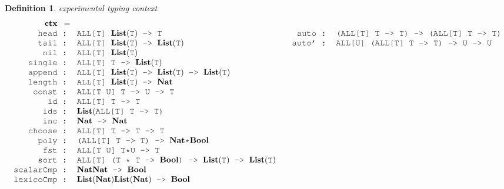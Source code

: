 \documentclass[table,dvipsnames,acmsmall]{acmart}
\theoremstyle{definition}
\newtheorem{definition}{Definition}[section]
\begin{document}
\begin{definition} 
  \label{def:experimental_typing_context}
  \emph{experimental typing context}
  \tiny
  \nopad
  \[
  \begin{array}[t]{ll}
    \begin{array}[t]{r@{}c@{}l}
      \textbf{ctx} & = &  \hfill
      \\
      \J{head} &\J{ : }& \J{ALL[T] }\textbf{List}(\J{T})\J{ -> T}
      \\
      \J{tail} &\J{ : }& \J{ALL[T] }\textbf{List}(\J{T})\J{ -> }\textbf{List}(\J{T})
      \\
      \J{nil} &\J{ : }& \J{ALL[T] }\textbf{List}(\J{T})
      \\
      \J{single} &\J{ : }& \J{ALL[T] T -> }\textbf{List}(\J{T})
      \\
      \J{append} &\J{ : }& \J{ALL[T] }\textbf{List}(\J{T}) \J{ -> } \textbf{List}(\J{T}) \J{ -> } \textbf{List}(\J{T})
      \\
      \J{length} &\J{ : }& \J{ALL[T] }\textbf{List}(\J{T}) \J{ -> } \textbf{Nat}
      \\
      \J{const} &\J{ : }& \J{ALL[T U] T -> U -> T}
      \\
      \J{id} &\J{ : }& \J{ALL[T] T -> T}
      \\
      \J{ids} &\J{ : }& \textbf{List}(\J{ALL[T] T -> T}\J{)}
      \\
      \J{inc} &\J{ : }& \textbf{Nat}\J{ -> }\textbf{Nat}
      \\
      \J{choose} &\J{ : }& \J{ALL[T] T -> T -> T}
      \\
      \J{poly} &\J{ : }& \J{(ALL[T] T -> T) -> } \textbf{Nat}\J{*}\textbf{Bool}
      \\
      \J{fst} &\J{ : }& \J{ALL[T U] T*U -> T}
      \\
      \J{sort} &\J{ : }& \J{ALL[T] (T * T -> } \textbf{Bool} \J{) -> }\textbf{List}(\J{T})\J{ -> }\textbf{List}(\J{T})
      \\
      \J{scalarCmp} &\J{ : }& \textbf{Nat} \J{\*} \textbf{Nat} \J{ -> } \textbf{Bool} 
      \\
      \J{lexicoCmp} &\J{ : }& \textbf{List}(\textbf{Nat}) \J{\*} \textbf{List}(\textbf{Nat}) \J{ -> } \textbf{Bool} 
    \end{array}
    &
    \begin{array}[t]{r@{}c@{}l}
      \\
      \J{auto} &\J{ : }& \J{(ALL[T] T -> T) -> (ALL[T] T -> T)}
      \\
      \J{auto'} &\J{ : }& \J{ALL[U] (ALL[T] T -> T) -> U -> U}

\end{array}
\end{array}\]
\end{definition}
\end{document}
